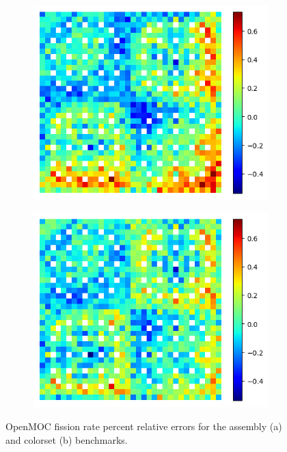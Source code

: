 \begin{figure}[h!]
\begin{subfigure}{0.45\textwidth}
  \centering
  \includegraphics[width=\linewidth]{figures/reflector/fiss-null-errors}
  \caption{}
  \label{fig:reflector-fiss-null-error}
\end{subfigure}%
\begin{subfigure}{0.45\textwidth}
  \centering
  \includegraphics[width=\linewidth]{figures/reflector/fiss-degenerate-errors}
  \caption{}
  \label{fig:reflector-fiss-degen-error}
\end{subfigure}
\caption{OpenMOC fission rate percent relative errors for the assembly (a) and colorset (b) benchmarks.}
\label{fig:fiss-errors}
\end{figure}


